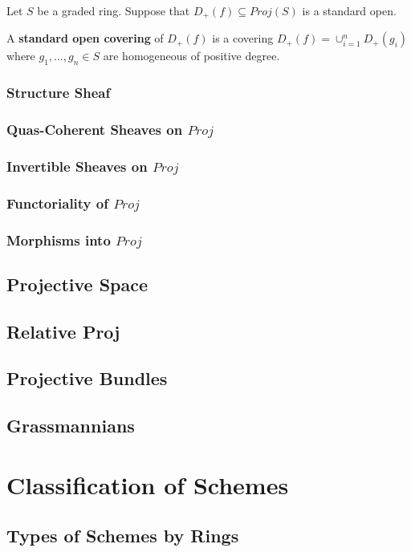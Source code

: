 \documentclass[Total.tex]{subfiles}
\begin{document}
					\begin{Def}
						Let $S$ be a graded ring. Suppose that $D_+(f)\subseteq Proj(S)$ is a standard open. 
						
						A \textbf{standard open covering} of $D_+(f)$ is a covering $D_+(f)=\cup_{i=1}^n D_+(g_i)$ where $g_1,\dots,g_n\in S$ are homogeneous of positive degree.
					\end{Def}
				\subsection{Structure Sheaf}
			\subsection{Quas-Coherent Sheaves on $Proj$}
			\subsection{Invertible Sheaves on $Proj$}
			\subsection{Functoriality of $Proj$}
			\subsection{Morphisms into $Proj$}
		\section{Projective Space}
		\section{Relative Proj}
		\section{Projective Bundles}
		\section{Grassmannians}
	\chapter{Classification of Schemes}
		\section{Types of Schemes by Rings}
\end{document}
